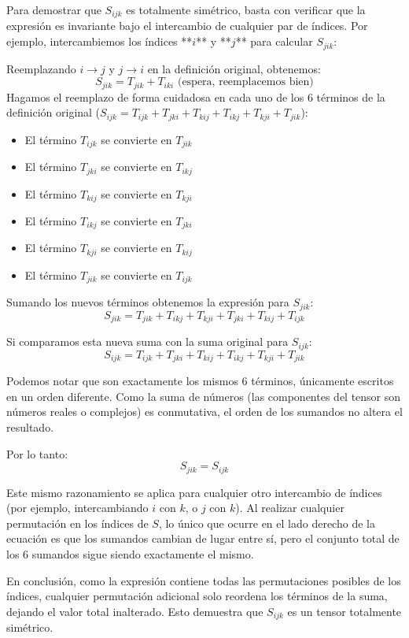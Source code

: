 \documentclass[11pt,spanish]{article}
\begin{document}
Para demostrar que $S_{ijk}$ es totalmente simétrico, basta con verificar que la expresión es invariante bajo el intercambio de cualquier par de índices. Por ejemplo, intercambiemos los índices **$i$** y **$j$** para calcular $S_{jik}$:

Reemplazando $i \to j$ y $j \to i$ en la definición original, obtenemos:
$$S_{jik} = T_{jik} + T_{iki} \text{ (espera, reemplacemos bien)} $$
Hagamos el reemplazo de forma cuidadosa en cada uno de los 6 términos de la definición original ($S_{ijk}=T_{ijk}+T_{jki}+T_{kij}+T_{ikj}+T_{kji}+T_{jik}$):
\begin{itemize}
\item El término $T_{ijk}$ se convierte en $T_{jik}$
\item El término $T_{jki}$ se convierte en $T_{ikj}$
\item El término $T_{kij}$ se convierte en $T_{kji}$
\item El término $T_{ikj}$ se convierte en $T_{jki}$
\item El término $T_{kji}$ se convierte en $T_{kij}$
\item El término $T_{jik}$ se convierte en $T_{ijk}$
\end{itemize}

Sumando los nuevos términos obtenemos la expresión para $S_{jik}$:
$$S_{jik} = T_{jik} + T_{ikj} + T_{kji} + T_{jki} + T_{kij} + T_{ijk}$$

Si comparamos esta nueva suma con la suma original para $S_{ijk}$:
$$S_{ijk} = T_{ijk} + T_{jki} + T_{kij} + T_{ikj} + T_{kji} + T_{jik}$$

Podemos notar que son exactamente los mismos 6 términos, únicamente escritos en un orden diferente. Como la suma de números (las componentes del tensor son números reales o complejos) es conmutativa, el orden de los sumandos no altera el resultado.

Por lo tanto:
$$S_{jik} = S_{ijk}$$

Este mismo razonamiento se aplica para cualquier otro intercambio de índices (por ejemplo, intercambiando $i$ con $k$, o $j$ con $k$). Al realizar cualquier permutación en los índices de $S$, lo único que ocurre en el lado derecho de la ecuación es que los sumandos cambian de lugar entre sí, pero el conjunto total de los 6 sumandos sigue siendo exactamente el mismo.

En conclusión, como la expresión contiene todas las permutaciones posibles de los índices, cualquier permutación adicional solo reordena los términos de la suma, dejando el valor total inalterado. Esto demuestra que $S_{ijk}$ es un tensor totalmente simétrico.
\end{document}
